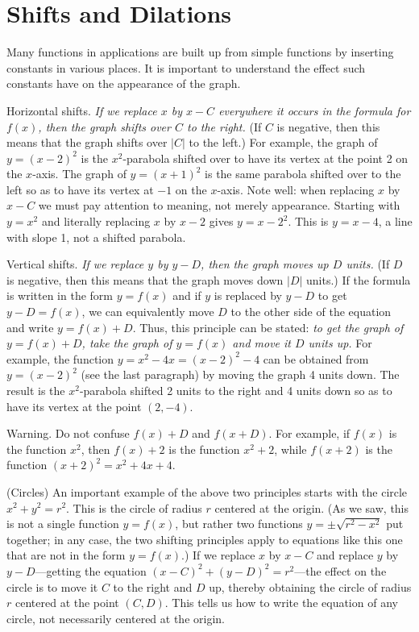 \section{Shifts and Dilations}{}{}

Many functions in applications are built up from simple functions by
inserting constants in various places.  It is important to understand
the effect such constants have on the appearance of the graph.

\ssk\noindent
{\txtbold Horizontal shifts.} {\em If we replace $x$ by $x-C$ everywhere it
occurs in the formula for $f(x)$, then the graph shifts over $C$ to the
right.} (If $C$ is negative, then this means that the graph shifts over
$|C|$ to the left.)  For example, the graph of $y=(x-2)^2$ is the
$x^2$-parabola shifted over to have its vertex at the point 2 on the
$x$-axis.  The graph of $y=(x+1)^2$ is the same parabola shifted over to
the left so as to have its vertex at $-1$ on the $x$-axis. Note well:
when replacing $x$ by $x-C$ we must pay attention to meaning, not
merely appearance. Starting with $y=x^2$ and literally replacing $x$
by $x-2$ gives $y=x-2^2$. This is $y=x-4$, a line with slope 1, not a
shifted parabola.

\ssk\noindent
{\txtbold Vertical shifts.} {\em If we replace $y$ by $y-D$, then the graph
moves up $D$ units.}  (If $D$ is negative, then this means that the graph
moves down $|D|$ units.)  If the formula is written in the form
$y=f(x)$ and if $y$ is replaced by $y-D$ to get $y-D=f(x)$, we can
equivalently move $D$ to the other side of the equation and write
$y=f(x)+D$.  Thus, this principle can be stated: {\em to get the
graph of $y=f(x)+D$, take the graph of $y=f(x)$ and move it $D$ units up.}
For example, the function $y=x^2-4x=(x-2)^2-4$ can be obtained from
$y=(x-2)^2$ (see the last paragraph) by moving the graph 4 units down.
The result is the $x^2$-parabola shifted 2 units to the right and 4 units
down so as to have its vertex at the point $(2,-4)$.

\ssk\noindent
{\txtbold Warning.}  Do not confuse $f(x)+D$ and $f(x+D)$.  For example,
if $f(x)$ is the function $x^2$, then $f(x)+2$ is the function $x^2+2$,
while $f(x+2)$ is the function $(x+2)^2=x^2+4x+4$.

\example (Circles) An important example of the above two principles
starts with the circle $x^2+y^2=r^2$.  This is the circle of radius
$r$ centered at the origin.  (As we saw, this is not a single function
$y=f(x)$, but rather two functions $y=\pm\sqrt{r^2-x^2}$ put together;
in any case, the two shifting principles apply to equations like this
one that are not in the form $y=f(x)$.)  If we replace $x$
by $x-C$ and replace $y$ by $y-D$---getting the equation
$(x-C)^2+(y-D)^2=r^2$---the effect on the circle is to move it $C$ to
the right and $D$ up, thereby obtaining the circle of radius $r$
centered at the point $(C,D)$.  This tells us how to write the
equation of any circle, not necessarily centered at the origin.
\endexample

